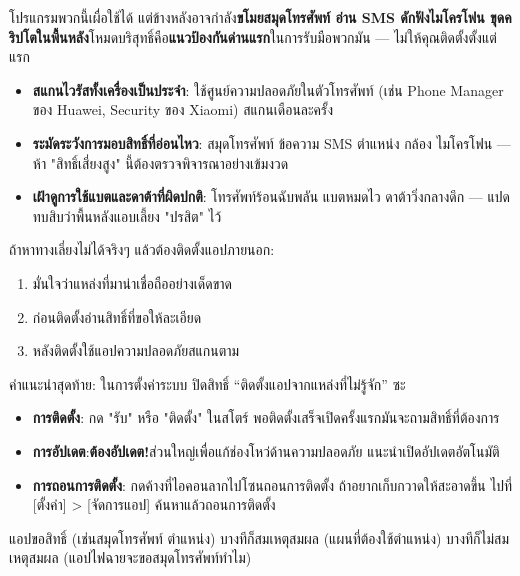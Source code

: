 โปรแกรมพวกนี้เผื่อใช้ได้ แต่ข้างหลังอาจกำลัง\textbf{ขโมยสมุดโทรศัพท์ อ่าน SMS ดักฟังไมโครโฟน ขุดคริปโตในพื้นหลัง}โหมดบริสุทธิ์คือ\textbf{แนวป้องกันด่านแรก}ในการรับมือพวกมัน — ไม่ให้คุณติดตั้งตั้งแต่แรก


\begin{itemize}
  \item \textbf{สแกนไวรัสทั้งเครื่องเป็นประจำ}: ใช้ศูนย์ความปลอดภัยในตัวโทรศัพท์ (เช่น Phone Manager ของ Huawei, Security ของ Xiaomi) สแกนเดือนละครั้ง
  \item \textbf{ระมัดระวังการมอบสิทธิ์ที่อ่อนไหว}: สมุดโทรศัพท์ ข้อความ SMS ตำแหน่ง กล้อง ไมโครโฟน — ห้า "สิทธิ์เสี่ยงสูง" นี้ต้องตรวจพิจารณาอย่างเข้มงวด
  \item \textbf{เฝ้าดูการใช้แบตและดาต้าที่ผิดปกติ}: โทรศัพท์ร้อนฉับพลัน แบตหมดไว ดาต้าวิ่งกลางดึก — แปดทบสิบว่าพื้นหลังแอบเลี้ยง "ปรสิต" ไว้
\end{itemize}

ถ้าหาทางเลี่ยงไม่ได้จริงๆ แล้วต้องติดตั้งแอปภายนอก:

\begin{enumerate}
  \item มั่นใจว่าแหล่งที่มาน่าเชื่อถืออย่างเด็ดขาด
  \item ก่อนติดตั้งอ่านสิทธิ์ที่ขอให้ละเอียด
  \item หลังติดตั้งใช้แอปความปลอดภัยสแกนตาม
\end{enumerate}

คำแนะนำสุดท้าย: ในการตั้งค่าระบบ ปิดสิทธิ์ “ติดตั้งแอปจากแหล่งที่ไม่รู้จัก” ซะ


\begin{itemize}
  \item \textbf{การติดตั้ง}: กด "รับ" หรือ "ติดตั้ง" ในสโตร์ พอติดตั้งเสร็จเปิดครั้งแรกมันจะถามสิทธิ์ที่ต้องการ
  \item \textbf{การอัปเดต}:\textbf{ต้องอัปเดต!}ส่วนใหญ่เพื่อแก้ช่องโหว่ด้านความปลอดภัย แนะนำเปิดอัปเดตอัตโนมัติ
  \item \textbf{การถอนการติดตั้ง}: กดค้างที่ไอคอนลากไปโซนถอนการติดตั้ง ถ้าอยากเก็บกวาดให้สะอาดขึ้น ไปที่ [ตั้งค่า] > [จัดการแอป] ค้นหาแล้วถอนการติดตั้ง
\end{itemize}


แอปขอสิทธิ์ (เช่นสมุดโทรศัพท์ ตำแหน่ง) บางทีก็สมเหตุสมผล (แผนที่ต้องใช้ตำแหน่ง) บางทีก็ไม่สมเหตุสมผล (แอปไฟฉายจะขอสมุดโทรศัพท์ทำไม)

